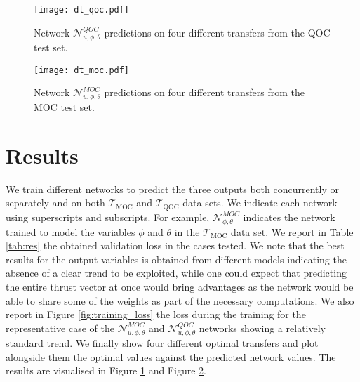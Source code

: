 \documentclass[graybox]{svmult}
\begin{document}
\begin{figure}[t]
\sidecaption
\texttt{[image: dt\_qoc.pdf]}
\caption{Network $\mathcal N^{QOC}_{u, \phi, \theta}$ predictions on four different transfers from the QOC test set.}
\label{fig:prediction_qc}
\end{figure}

\begin{figure}[t]
\sidecaption
\texttt{[image: dt\_moc.pdf]}
\caption{Network $\mathcal N^{MOC}_{u, \phi, \theta}$ predictions on four different transfers from the MOC test set.}
\label{fig:prediction_moc}
\end{figure}

\section{Results}
We train different networks to predict the three outputs both concurrently or separately and on both $\mathcal{T}_{\mbox{MOC}}$ and $\mathcal{T}_{\mbox{QOC}}$ data sets. 
We indicate each network using superscripts and subscripts.
For example,  $\mathcal N^{MOC}_{\phi, \theta}$ indicates the network trained to model the variables $\phi$ and $\theta$ in the $\mathcal{T}_{\mbox{MOC}}$ data set. 
We report in Table \ref{tab:res} the obtained validation loss in the cases tested. We note that the best results for the output variables is obtained from different models indicating the absence of a clear trend to be exploited, while one could expect that predicting the entire thrust vector at once would bring advantages as the network would be able to share some of the weights as part of the necessary computations. We also report in Figure \ref{fig:training_loss} the loss during the training for the representative case of the $\mathcal N^{MOC}_{u, \phi, \theta}$ and $\mathcal N^{QOC}_{u, \phi, \theta}$ networks showing a relatively standard trend. We finally show four different optimal transfers and plot alongside them the optimal values against the predicted network values. The results are visualised in Figure \ref{fig:prediction_qc} and Figure  \ref{fig:prediction_moc}.

% 
\end{document}

